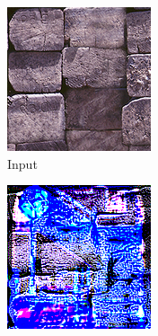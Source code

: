 \begin{figure}[]
\begin{subfigure}{\textwidth}
        \begin{subfigure}{0.19\textwidth}
            \centering
            \includegraphics[width=\textwidth]{images/04-experiment03/staircase_beams_target.jpg}
            \caption{Input}
            \label{fig:ex03-staircase_illum-beams-target}
        \end{subfigure}
        \hfill
        \begin{subfigure}{0.19\textwidth}
            \centering
            \includegraphics[width=\textwidth]{images/04-experiment03/staircase_illum/beams/stats_im.jpg}

\end{subfigure}
\end{subfigure}
\end{figure}
